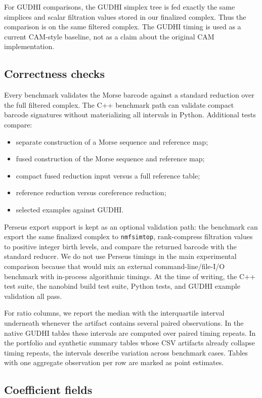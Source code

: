 \documentclass[11pt]{article}
\begin{document}
For GUDHI comparisons, the GUDHI simplex tree is fed exactly the same simplices and scalar
filtration values stored in our finalized complex.  Thus the comparison is on the same
filtered complex.  The GUDHI timing is used as a current CAM-style baseline, not as a claim
about the original CAM implementation.

\subsection{Correctness checks}

Every benchmark validates the Morse barcode against a standard reduction over the full
filtered complex.  The C++ benchmark path can validate compact barcode signatures without
materializing all intervals in Python.  Additional tests compare:
\begin{itemize}
  \item separate construction of a Morse sequence and reference map;
  \item fused construction of the Morse sequence and reference map;
  \item compact fused reduction input versus a full reference table;
  \item reference reduction versus coreference reduction;
  \item selected examples against GUDHI.
\end{itemize}
Perseus export support is kept as an optional validation path: the benchmark can export the
same finalized complex to \texttt{nmfsimtop}, rank-compress filtration values to positive
integer birth levels, and compare the returned barcode with the standard reducer.  We do
not use Perseus timings in the main experimental comparison because that would mix an
external command-line/file-I/O benchmark with in-process algorithmic timings.
At the time of writing, the C++ test suite, the nanobind build test suite, Python tests, and
GUDHI example validation all pass.

For ratio columns, we report the median with the interquartile interval underneath whenever
the artifact contains several paired observations.  In the native GUDHI tables these
intervals are computed over paired timing repeats.  In the portfolio and synthetic summary
tables whose CSV artifacts already collapse timing repeats, the intervals describe
variation across benchmark cases.  Tables with one aggregate observation per row are
marked as point estimates.

\subsection{Coefficient fields}
\end{document}

